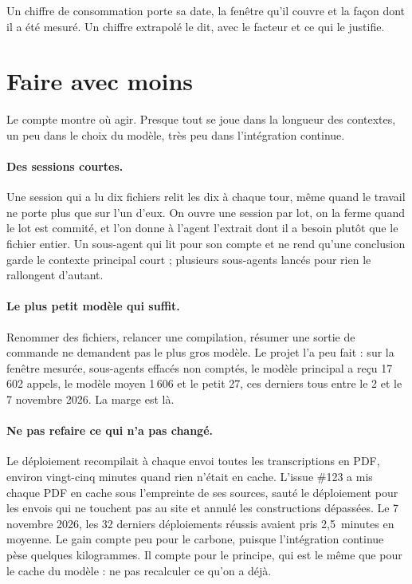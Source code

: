 \begin{regle}
Un chiffre de consommation porte sa date, la fenêtre qu'il couvre et la façon dont il a
été mesuré. Un chiffre extrapolé le dit, avec le facteur et ce qui le justifie.
\end{regle}

\section{Faire avec moins}

Le compte montre où agir. Presque tout se joue dans la longueur des contextes, un peu dans
le choix du modèle, très peu dans l'intégration continue.

\paragraph{Des sessions courtes.} Une session qui a lu dix fichiers relit les dix à chaque
tour, même quand le travail ne porte plus que sur l'un d'eux. On ouvre une session par
lot, on la ferme quand le lot est commité, et l'on donne à l'agent l'extrait dont il a
besoin plutôt que le fichier entier. Un sous-agent qui lit pour son compte et ne rend
qu'une conclusion garde le contexte principal court ; plusieurs sous-agents lancés pour
rien le rallongent d'autant.

\paragraph{Le plus petit modèle qui suffit.} Renommer des fichiers, relancer une
compilation, résumer une sortie de commande ne demandent pas le plus gros modèle. Le projet
l'a peu fait : sur la fenêtre mesurée, sous-agents effacés non comptés, le modèle principal
a reçu 17\,602 appels, le modèle moyen 1\,606 et le petit 27, ces derniers tous entre le 2
et le 7 novembre 2026. La marge est là.

\paragraph{Ne pas refaire ce qui n'a pas changé.} Le déploiement recompilait à chaque envoi
toutes les transcriptions en PDF, environ vingt-cinq minutes quand rien n'était en cache.
L'issue \#123 a mis chaque PDF en cache sous l'empreinte de ses sources, sauté le
déploiement pour les envois qui ne touchent pas au site et annulé les constructions
dépassées. Le 7 novembre 2026, les 32 derniers déploiements réussis avaient pris
2,5~minutes en moyenne. Le gain compte peu pour le carbone, puisque l'intégration continue
pèse quelques kilogrammes. Il compte pour le principe, qui est le même que pour le cache du
modèle : ne pas recalculer ce qu'on a déjà.

